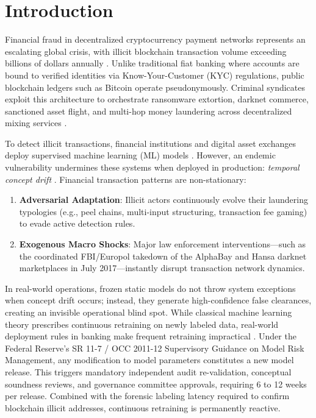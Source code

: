\documentclass[conference]{IEEEtran}
\begin{document}
\section{Introduction}
Financial fraud in decentralized cryptocurrency payment networks represents an escalating global crisis, with illicit blockchain transaction volume exceeding billions of dollars annually \cite{datavisor}. Unlike traditional fiat banking where accounts are bound to verified identities via Know-Your-Customer (KYC) regulations, public blockchain ledgers such as Bitcoin operate pseudonymously. Criminal syndicates exploit this architecture to orchestrate ransomware extortion, darknet commerce, sanctioned asset flight, and multi-hop money laundering across decentralized mixing services \cite{semon2026, karunya2025}.

To detect illicit transactions, financial institutions and digital asset exchanges deploy supervised machine learning (ML) models \cite{li2024}. However, an endemic vulnerability undermines these systems when deployed in production: \textit{temporal concept drift} \cite{gama2014}. Financial transaction patterns are non-stationary:
\begin{enumerate}
    \item \textbf{Adversarial Adaptation}: Illicit actors continuously evolve their laundering typologies (e.g., peel chains, multi-input structuring, transaction fee gaming) to evade active detection rules.
    \item \textbf{Exogenous Macro Shocks}: Major law enforcement interventions---such as the coordinated FBI/Europol takedown of the AlphaBay and Hansa darknet marketplaces in July 2017---instantly disrupt transaction network dynamics.
\end{enumerate}

In real-world operations, frozen static models do not throw system exceptions when concept drift occurs; instead, they generate high-confidence false clearances, creating an invisible operational blind spot. While classical machine learning theory prescribes continuous retraining on newly labeled data, real-world deployment rules in banking make frequent retraining impractical \cite{sr117}. Under the Federal Reserve's SR 11-7 / OCC 2011-12 Supervisory Guidance on Model Risk Management, any modification to model parameters constitutes a new model release. This triggers mandatory independent audit re-validation, conceptual soundness reviews, and governance committee approvals, requiring 6 to 12 weeks per release. Combined with the forensic labeling latency required to confirm blockchain illicit addresses, continuous retraining is permanently reactive.
\end{document}

